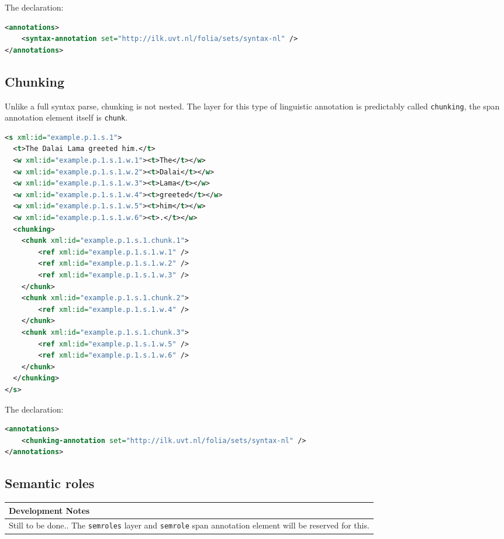 \documentclass[a4paper,12pt]{report}
\newenvironment{devnotes}
{\newpage
\begin{center}
    \begin{tabular}[h!]{|p{0.8\textwidth}|}
    \hline
    {\bf Development Notes}\\\hline}
{   \\\hline
    \end{tabular}
\end{center}}
\begin{document}
The declaration:

\begin{lstlisting}[language=xml]
<annotations>
    <syntax-annotation set="http://ilk.uvt.nl/folia/sets/syntax-nl" />
</annotations>
\end{lstlisting}


\subsection{Chunking}

Unlike a full syntax parse, chunking is not nested. The layer for this type of linguistic annotation is predictably called \texttt{chunking}, the span annotation element itself is \texttt{chunk}.

\begin{lstlisting}[language=xml]
<s xml:id="example.p.1.s.1">
  <t>The Dalai Lama greeted him.</t>
  <w xml:id="example.p.1.s.1.w.1"><t>The</t></w>
  <w xml:id="example.p.1.s.1.w.2"><t>Dalai</t></w>
  <w xml:id="example.p.1.s.1.w.3"><t>Lama</t></w>
  <w xml:id="example.p.1.s.1.w.4"><t>greeted</t></w>
  <w xml:id="example.p.1.s.1.w.5"><t>him</t></w>
  <w xml:id="example.p.1.s.1.w.6"><t>.</t></w>
  <chunking>
    <chunk xml:id="example.p.1.s.1.chunk.1">       
        <ref xml:id="example.p.1.s.1.w.1" />       
        <ref xml:id="example.p.1.s.1.w.2" />       
        <ref xml:id="example.p.1.s.1.w.3" />        
    </chunk>
    <chunk xml:id="example.p.1.s.1.chunk.2">       
        <ref xml:id="example.p.1.s.1.w.4" />
    </chunk>
    <chunk xml:id="example.p.1.s.1.chunk.3">       
        <ref xml:id="example.p.1.s.1.w.5" />
        <ref xml:id="example.p.1.s.1.w.6" />
    </chunk>    
  </chunking>
</s>
\end{lstlisting}


The declaration:

\begin{lstlisting}[language=xml]
<annotations>
    <chunking-annotation set="http://ilk.uvt.nl/folia/sets/syntax-nl" />
</annotations>
\end{lstlisting}



\subsection{Semantic roles}

\begin{devnotes}
Still to be done.. The \texttt{semroles} layer and \texttt{semrole} span annotation element will be reserved for this.
\end{devnotes}
\end{document}
